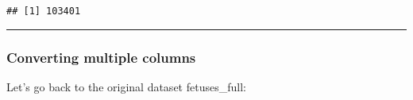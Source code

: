 \documentclass[
]{article}
\newenvironment{Shaded}{\begin{snugshade}}{\end{snugshade}}
\newcommand{\KeywordTok}[1]{\textcolor[rgb]{0.13,0.29,0.53}{\textbf{#1}}}
\newcommand{\NormalTok}[1]{#1}
\newcommand{\OperatorTok}[1]{\textcolor[rgb]{0.81,0.36,0.00}{\textbf{#1}}}
\newcommand{\StringTok}[1]{\textcolor[rgb]{0.31,0.60,0.02}{#1}}
\begin{document}
\begin{verbatim}
## [1] 103401
\end{verbatim}

\begin{center}\rule{0.5\linewidth}{0.5pt}\end{center}

\hypertarget{converting-multiple-columns}{%
\subsubsection{Converting multiple
columns}\label{converting-multiple-columns}}

Let's go back to the original dataset fetuses\_full:

\begin{Shaded}
\end{Shaded}
\end{document}
